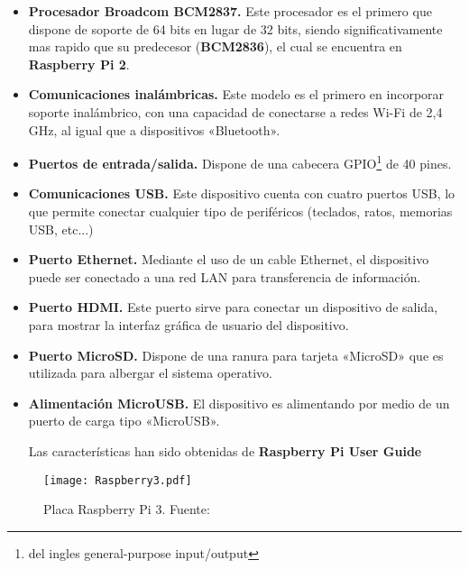 \begin{itemize}
\item \textbf{Procesador Broadcom BCM2837.} Este procesador es el primero que dispone de soporte de 64 bits en lugar de 32 bits, siendo significativamente mas rapido que su predecesor (\textbf{BCM2836}), el cual se encuentra en \textbf{Raspberry Pi 2}.

\item \textbf{Comunicaciones inalámbricas.} Este modelo es el primero en incorporar soporte inalámbrico, con una capacidad de conectarse a redes Wi-Fi de 2,4 GHz, al igual que a dispositivos «Bluetooth».

\item \textbf{Puertos de entrada/salida.} Dispone de una cabecera GPIO\footnote{del ingles general-purpose input/output} de 40 pines.

\item \textbf{Comunicaciones USB.} Este dispositivo cuenta con cuatro puertos USB, lo que permite conectar cualquier tipo de periféricos (teclados, ratos, memorias USB, etc...)

\item \textbf{Puerto Ethernet.} Mediante el uso de un cable Ethernet, el dispositivo puede ser conectado a una red LAN para transferencia de información.

\item \textbf{Puerto HDMI.} Este puerto sirve para conectar un dispositivo de salida, para mostrar la interfaz gráfica de usuario del dispositivo.

\item \textbf{Puerto MicroSD.} Dispone de una ranura para tarjeta «MicroSD» que es utilizada para albergar el sistema operativo.

\item \textbf{Alimentación MicroUSB.} El dispositivo es alimentando por medio de un puerto de carga tipo «MicroUSB».

Las características han sido obtenidas de \textbf{Raspberry Pi User Guide ~\cite{Upton}}

\end{itemize}

\begin{figure}[!h]
\begin{center}
\texttt{[image: Raspberry3.pdf]}
\caption{Placa Raspberry Pi 3. Fuente: ~\cite{Upton}}
\label{fig:Raspberry3}
\end{center}
\end{figure}


